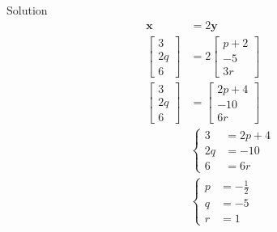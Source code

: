 \documentclass[12pt]{article}
\begin{document}
Solution
\begin{align*}
    \mathbf{x} &= 2\mathbf{y}
    \\  \begin{bmatrix}    3 \\ 2q \\ 6 \end{bmatrix}  &= 2  \begin{bmatrix}
    p+2 \\ -5 \\ 3r \end{bmatrix}
    \\ \begin{bmatrix}    3 \\ 2q \\ 6 \end{bmatrix}  &= \begin{bmatrix}
    2p+4 \\ -10 \\ 6r \end{bmatrix}
    \\ & \begin{cases}
        3 &= 2p+4
        \\ 2q &= -10
        \\ 6 &= 6r
    \end{cases}
    \\ & \begin{cases}
        p &= -\frac{1}{2} 
        \\ q &= -5
        \\  r &=1
    \end{cases}
\end{align*}
\end{document}
